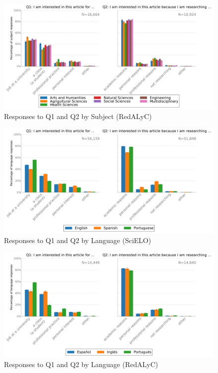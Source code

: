 \begin{figure}[htbp]
\centering
\includegraphics[keepaspectratio,width=\textwidth,height=0.75\textheight]{figures/redalyc_q1_q2_by_latindex_subjects.pdf}
\caption{Responses to Q1 and Q2 by Subject (RedALyC)}
\label{redalyc_q1_q2_by_latindex_subjects}
\end{figure}

\begin{figure}[htbp]
\centering
\includegraphics[keepaspectratio,width=\textwidth,height=0.75\textheight]{figures/scielo_q1_q2_by_original_language.pdf}
\caption{Responses to Q1 and Q2 by Language (SciELO)}
\label{scielo_q1_q2_by_original_language}
\end{figure}

\begin{figure}[htbp]
\centering
\includegraphics[keepaspectratio,width=\textwidth,height=0.75\textheight]{figures/redalyc_q1_q2_by_original_language.pdf}
\caption{Responses to Q1 and Q2 by Language (RedALyC)}
\label{redalyc_q1_q2_by_original_language}
\end{figure}

